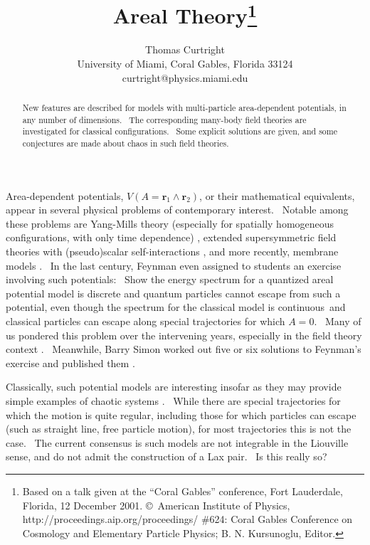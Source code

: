 \documentclass[a4paper,12pt]{article}%
\begin{document}
\title{Areal Theory\thanks{Based on a talk given at the ``Coral Gables'' conference,
Fort Lauderdale, Florida, 12 December 2001. \copyright\ American Institute of
Physics, http://proceedings.aip.org/proceedings/ \#624: Coral Gables
Conference on Cosmology and Elementary Particle Physics; B. N. Kursunoglu, Editor.}}
\author{{\large Thomas Curtright}\\{\normalsize University of Miami, Coral Gables, Florida 33124}\\{\small curtright@physics.miami.edu}}
\date{}
\maketitle

\begin{abstract}
New features are described for models with multi-particle area-dependent
potentials, in any number of dimensions. \ The corresponding many-body field
theories are investigated for classical configurations. \ Some explicit
solutions are given, and some conjectures are made about chaos in such field theories.

\bigskip

\bigskip

\end{abstract}

Area-dependent potentials, $V\left(  A=\mathbf{r}_{1}\wedge\mathbf{r}%
_{2}\right)  $, or their mathematical equivalents, appear in several physical
problems of contemporary interest. \ Notable among these problems are
Yang-Mills theory (especially for spatially homogeneous configurations, with
only time dependence) \cite{Chang}, extended supersymmetric field theories
with (pseudo)scalar self-interactions \cite{Howe,Ferrara,Lee}, and more
recently, membrane models \cite{de Wit,Graf}. \ In the last century, Feynman
\cite{Feynman} even assigned to students an exercise involving such
potentials: \ Show the energy spectrum for a quantized areal potential model
is discrete and quantum particles cannot escape from such a potential, even
though the spectrum for the classical model is continuous\ and classical
particles can escape along special trajectories for which $A=0$. \ Many of us
pondered this problem over the intervening years, especially in the field
theory context \cite{TLC1989}. \ Meanwhile, Barry Simon worked out five or six
solutions to Feynman's exercise and published them \cite{Simon}.

Classically, such potential models are interesting insofar as they may provide
simple examples of chaotic systems \cite{Saviddy,Carnegie}. \ While there are
special trajectories for which the motion is quite regular, including those
for which particles can escape (such as straight line, free particle motion),
for most trajectories this is not the case. \ The current consensus is such
models are not integrable in the Liouville sense, and do not admit the
construction of a Lax pair. \ Is this really so?
\end{document}
